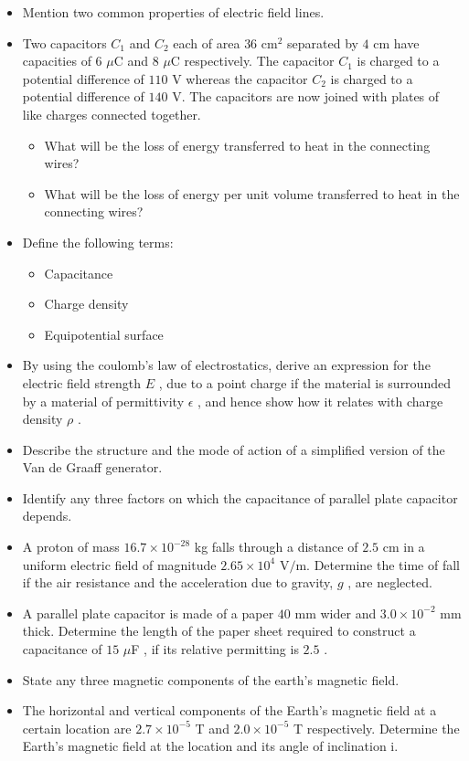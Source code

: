 \documentclass{article}
\begin{document}
\begin{itemize}
\item Mention two common properties of electric field lines.
\item Two capacitors $ C_{1}$ and $ C_{2}$ each of area $ 36$ cm$ ^{2}$ separated by $ 4$ cm have capacities of $ 6$ $\mu$C and $ 8$ $\mu$C respectively.  The capacitor $ C_{1}$ is charged to a potential difference of $ 110$ V whereas the capacitor $ C_{2}$ is charged to a potential difference of $ 140$ V.  The capacitors are now joined with plates of like charges connected together.
 \begin{itemize}
\item What will be the loss of energy transferred to heat in the connecting wires?
\item What will be the loss of energy per unit volume transferred to heat in the connecting wires?
\end{itemize}
\item Define the following terms:
 \begin{itemize}
\item Capacitance
\item Charge density
\item Equipotential surface
\end{itemize}
\item By using the coulomb’s law of electrostatics, derive an expression for the electric field strength $ E$ , due to a point charge if the material is surrounded by a material of permittivity $ \epsilon $ , and hence show how it relates with charge density $ \rho $ .
\item Describe the structure and the mode of action of a simplified version of the Van de Graaff generator.
\item Identify any three factors on which the capacitance of parallel plate capacitor depends.
\item A proton of mass $ 16.7 \times 10^{-28}$ kg falls through a distance of $ 2.5$ cm in a uniform electric field of magnitude $ 2.65 \times 10^{4}$ V$/$m.  Determine the time of fall if the air resistance and the acceleration due to gravity, $ g$ , are neglected.
\item A parallel plate capacitor is made of a paper $ 40$ mm wider and $ 3.0 \times 10^{-2}$ mm thick.  Determine the length of the paper sheet required to construct a capacitance of $ 15$ $\mu$F , if its relative permitting is $ 2.5$ .
\item State any three magnetic components of the earth’s magnetic field.
\item The horizontal and vertical components of the Earth’s magnetic field at a certain location are $ 2.7 \times 10^{-5}$ T and $ 2.0 \times 10^{-5}$ T respectively.  Determine the Earth’s magnetic field at the location and its angle of inclination i.

\end{itemize}
\end{document}
